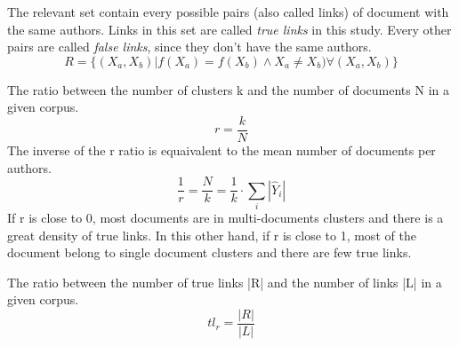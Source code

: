 \begin{definition}
  The relevant set contain every possible pairs (also called links) of document with the same authors. Links in this set are called \textit{true links} in this study. Every other pairs are called \textit{false links}, since they don't have the same authors.
  \begin{equation}
    R = \{(X_a, X_b) | f(X_a) = f(X_b) \land X_a \neq X_b) \forall (X_a, X_b)\}
  \end{equation}
\end{definition}

\begin{definition}
  The ratio between the number of clusters k and the number of documents N in a given corpus.
  \begin{equation}
    r = \frac{k}{N}
  \end{equation}
  The inverse of the r ratio is equaivalent to the mean number of documents per authors.
  \begin{equation}
    \frac{1}{r} = \frac{N}{k} = \frac{1}{k} \cdot \sum_{i} |\hat{Y}_i|
  \end{equation}
  If r is close to 0, most documents are in multi-documents clusters and there is a great density of true links.
  In this other hand, if r is close to 1, most of the document belong to single document clusters and there are few true links.
\end{definition}

\begin{definition}
  The ratio between the number of true links |R| and the number of links |L| in a given corpus.
  \begin{equation}
    tl_r = \frac{|R|}{|L|}
  \end{equation}
\end{definition}
